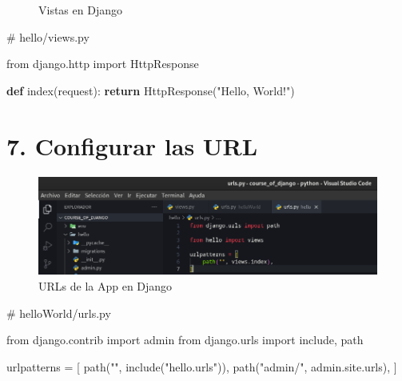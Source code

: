 \documentclass[
  a4paper,
  DIV=11,
  numbers=noendperiod,
  onepage,
  openany]{scrreprt}
\newenvironment{Shaded}{\begin{snugshade}}{\end{snugshade}}
\newcommand{\CommentTok}[1]{\textcolor[rgb]{0.37,0.37,0.37}{#1}}
\newcommand{\ControlFlowTok}[1]{\textcolor[rgb]{0.00,0.23,0.31}{\textbf{#1}}}
\newcommand{\ImportTok}[1]{\textcolor[rgb]{0.00,0.46,0.62}{#1}}
\newcommand{\KeywordTok}[1]{\textcolor[rgb]{0.00,0.23,0.31}{\textbf{#1}}}
\newcommand{\NormalTok}[1]{\textcolor[rgb]{0.00,0.23,0.31}{#1}}
\newcommand{\OperatorTok}[1]{\textcolor[rgb]{0.37,0.37,0.37}{#1}}
\newcommand{\StringTok}[1]{\textcolor[rgb]{0.13,0.47,0.30}{#1}}
\begin{document}
\begin{tcolorbox}
\begin{figure}[H]
{}

\caption{Vistas en Django}

\end{figure}%

\begin{Shaded}
\begin{Highlighting}[]
\CommentTok{\# hello/views.py}

\ImportTok{from}\NormalTok{ django.http }\ImportTok{import}\NormalTok{ HttpResponse}

\KeywordTok{def}\NormalTok{ index(request):}
    \ControlFlowTok{return}\NormalTok{ HttpResponse(}\StringTok{"Hello, World!"}\NormalTok{)}
\end{Highlighting}
\end{Shaded}

\section{7. Configurar las URL}\label{configurar-las-url}

\begin{figure}[H]

{\centering \includegraphics{images/urls_app_django.png}

}

\caption{URLs de la App en Django}

\end{figure}%

\begin{Shaded}
\begin{Highlighting}[]
\CommentTok{\# helloWorld/urls.py}

\ImportTok{from}\NormalTok{ django.contrib }\ImportTok{import}\NormalTok{ admin}
\ImportTok{from}\NormalTok{ django.urls }\ImportTok{import}\NormalTok{ include, path}

\NormalTok{urlpatterns }\OperatorTok{=}\NormalTok{ [}
\NormalTok{    path(}\StringTok{""}\NormalTok{, include(}\StringTok{"hello.urls"}\NormalTok{)),}
\NormalTok{    path(}\StringTok{"admin/"}\NormalTok{, admin.site.urls),}
\NormalTok{]}
\end{Highlighting}
\end{Shaded}


\end{tcolorbox}
\end{document}
